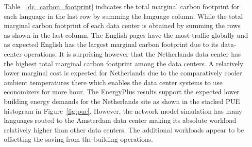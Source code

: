 
 



Table~ \ref{dc_carbon_footprint} indicates the total marginal carbon footprint for each language in the last row by summing the language column. While the total marginal carbon footprint of each data center is obtained by summing the rows as shown in the last column. The English pages have the most traffic globally and as expected English has the largest marginal carbon footprint due to its data-center operations. It is surprising however that the Netherlands data center has the highest total marginal carbon footprint among the data centers. A relatively lower marginal cost is expected for Netherlands due to the comparatively cooler ambient temperatures there which enables the data center systems to use economizers for more hour. The EnergyPlus results support the expected lower building energy demands for the Netherlands site as shown in the stacked PUE histogram in Figure~\ref{fig:pue}. However, the network model simulation has many languages routed to the Amsterdam data center making its absolute workload relatively higher than other data centers. The additional workloads appear to be offsetting the saving from the building operations.

